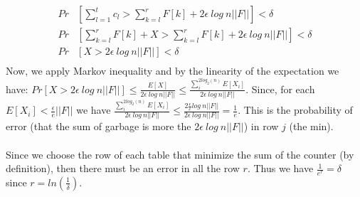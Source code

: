 \documentclass[a4paper]{article}
\begin{document}
\begin{align*}
Pr &[\sum^t_{l=1}c_l > \sum^r_{k=l}F[k] + 2\epsilon\ log\ n ||F||]<\delta \\
Pr &[ \sum^r_{k=l}F[k] +X  > \sum^r_{k=l}F[k] + 2\epsilon\ log\ n ||F||]<\delta \\
Pr &[ X  >  2\epsilon\ log\ n ||F||]<\delta \\
\end{align*}
Now, we apply Markov inequality and by the linearity of the expectation we have: $Pr [ X  >  2\epsilon\ log\ n ||F||] \leq \frac{E[X]}{2\epsilon\ log\ n ||F||} \leq \frac{\sum_{i}^{2log_2(n)} E[X_i]}{2\epsilon\ log\ n ||F||}$. Since, for each $E[X_i]< \frac{\epsilon}{e}||F||$ we have $\frac{\sum_{i}^{2log_2(n)} E[X_i]}{2\epsilon\ log\ n ||F||} \leq \frac{2 \frac{\epsilon}{e}log \ n||F||}{2\epsilon\ log\ n ||F||}= \frac{1}{e}$. This is the probability of error (that the sum of garbage is more the $2\epsilon\ log\ n ||F||$) in row $j$ (the min).
\\
\\
Since we choose the row of each table that minimize the sum of the counter (by definition), then there must be an error in all the row $r$. Thus we have $\frac{1}{e^r}=\delta$ since $r=ln(\frac{1}{\delta})$.
\end{document}
